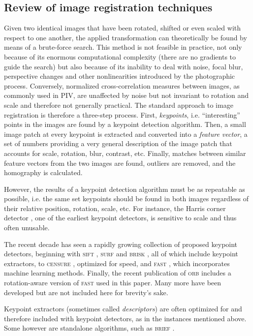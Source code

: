 \documentclass[11.5pt,oneside]{book}
\begin{document}
\subsection{Review of image registration techniques \label{sec:keypoint-review}} Given two
identical images that have been rotated, shifted or even scaled with respect to
one another, the applied transformation can theoretically be found by means of a
brute-force search. This method is not feasible in practice, not only because of
its enormous computational complexity (there are no gradients to guide the
search) but also because of its inability to deal with noise, focal blur,
perspective changes and other nonlinearities introduced by the photographic
process. Conversely, normalized cross-correlation measures between images, as
commonly used in PIV, are unaffected by noise but not invariant to rotation and
scale and therefore not generally practical. The standard approach to image
registration is therefore a three-step process. First, \emph{keypoints}, i.e.
``interesting'' points in the images are found by a keypoint detection
algorithm.  Then, a small image patch at every keypoint is extracted and
converted into a \emph{feature vector}, a set of numbers providing a very
general description of the image patch that accounts for scale, rotation, blur,
contrast, etc. Finally, matches between similar feature vectors from the two
images are found, outliers are removed, and the homography is calculated.

However, the results of a keypoint detection algorithm
must be as repeatable as possible, i.e. the same set keypoints should be found
in both images regardless of their relative position, rotation, scale, etc. 
For instance, the Harris corner detector \cite{Harris88}, one of the earliest
keypoint detectors, is sensitive to scale and thus often unusable.

The recent decade has seen a rapidly growing collection of proposed keypoint detectors,
beginning with \textsc{sift} \cite{Lowe04}, \textsc{surf} \cite{Bay08} and
\textsc{brisk} \cite{Leutenegger11}, all of which include keypoint extractors, to
\textsc{censure} \cite{Agrawal08}, optimized for speed, and
\textsc{fast} \cite{Rosten05}, which incorporates machine learning methods.
Finally, the recent publication of \textsc{orb} \cite{Rublee11} includes a
rotation-aware version of \textsc{fast} used in this paper. Many more have been
developed but are not included here for brevity's sake.

Keypoint extractors (sometimes called \emph{descriptors}) are often optimized
for and therefore included with keypoint detectors, as in the instances
mentioned above. Some however are standalone algorithms, such as
\textsc{brief} \cite{Calonder10}.
\end{document}
